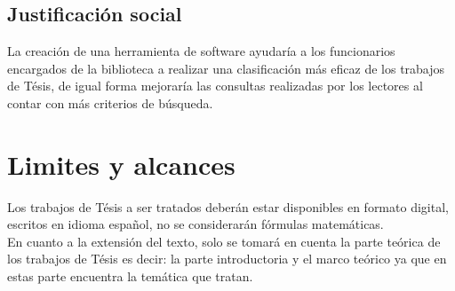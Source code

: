 \subsection{Justificaci\'on social}
La creaci\'on de una herramienta de software ayudar\'ia a los funcionarios encargados
de la biblioteca a realizar una clasificaci\'on m\'as eficaz de los trabajos de T\'esis,
de igual forma mejorar\'ia las consultas realizadas por los lectores al contar con 
m\'as criterios de b\'usqueda.




\section{Limites y alcances}
Los trabajos de T\'esis a ser tratados deber\'an estar disponibles en formato digital,
escritos en idioma espa\~nol, no se considerar\'an f\'ormulas matem\'aticas. \\

En cuanto a la extensi\'on del texto, solo se tomar\'a en cuenta la parte te\'orica de
los trabajos de T\'esis es decir: la parte introductoria y el marco te\'orico ya que
en estas parte encuentra la tem\'atica que tratan.


